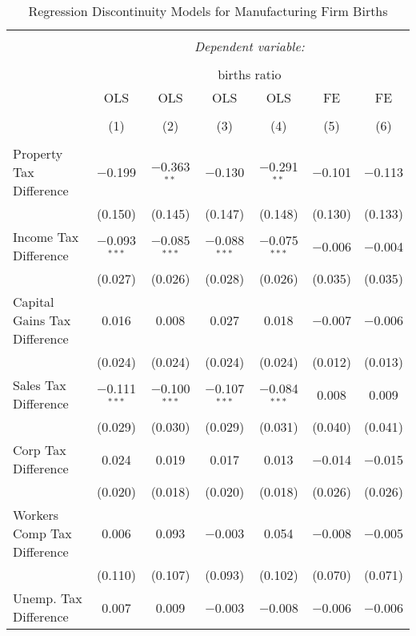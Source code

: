 
\begin{table}[!htbp] \centering 
  \caption{Regression Discontinuity Models for  Manufacturing Firm Births} 
  \label{31-33rd} 
\footnotesize 
\begin{tabular}{@{\extracolsep{5pt}}lcccccc} 
\\[-1.8ex]\hline 
\hline \\[-1.8ex] 
 & \multicolumn{6}{c}{\textit{Dependent variable:}} \\ 
\cline{2-7} 
\\[-1.8ex] & \multicolumn{6}{c}{births ratio} \\ 
 & OLS & OLS & OLS & OLS & FE & FE \\ 
\\[-1.8ex] & (1) & (2) & (3) & (4) & (5) & (6)\\ 
\hline \\[-1.8ex] 
 Property Tax Difference & $-$0.199 & $-$0.363$^{**}$ & $-$0.130 & $-$0.291$^{**}$ & $-$0.101 & $-$0.113 \\ 
  & (0.150) & (0.145) & (0.147) & (0.148) & (0.130) & (0.133) \\ 
  Income Tax Difference & $-$0.093$^{***}$ & $-$0.085$^{***}$ & $-$0.088$^{***}$ & $-$0.075$^{***}$ & $-$0.006 & $-$0.004 \\ 
  & (0.027) & (0.026) & (0.028) & (0.026) & (0.035) & (0.035) \\ 
  Capital Gains Tax Difference & 0.016 & 0.008 & 0.027 & 0.018 & $-$0.007 & $-$0.006 \\ 
  & (0.024) & (0.024) & (0.024) & (0.024) & (0.012) & (0.013) \\ 
  Sales Tax Difference & $-$0.111$^{***}$ & $-$0.100$^{***}$ & $-$0.107$^{***}$ & $-$0.084$^{***}$ & 0.008 & 0.009 \\ 
  & (0.029) & (0.030) & (0.029) & (0.031) & (0.040) & (0.041) \\ 
  Corp Tax Difference & 0.024 & 0.019 & 0.017 & 0.013 & $-$0.014 & $-$0.015 \\ 
  & (0.020) & (0.018) & (0.020) & (0.018) & (0.026) & (0.026) \\ 
  Workers Comp Tax Difference & 0.006 & 0.093 & $-$0.003 & 0.054 & $-$0.008 & $-$0.005 \\ 
  & (0.110) & (0.107) & (0.093) & (0.102) & (0.070) & (0.071) \\ 
  Unemp. Tax Difference & 0.007 & 0.009 & $-$0.003 & $-$0.008 & $-$0.006 & $-$0.006 \\ 

\end{tabular}
\end{table}
